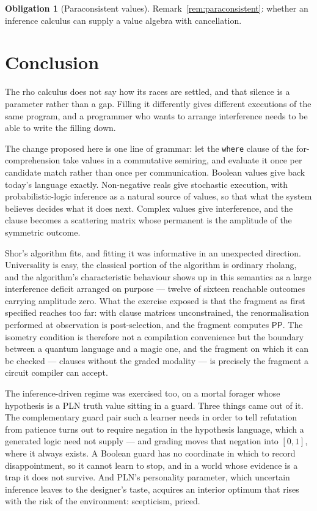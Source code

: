 \documentclass[11pt,a4paper]{article}
\theoremstyle{plain}
\theoremstyle{definition}
\newtheorem{obligation}[theorem]{Obligation}
\theoremstyle{remark}
\begin{document}
\begin{obligation}[Paraconsistent values]\label{ob:para}
Remark~\ref{rem:paraconsistent}: whether an inference calculus can supply a value
algebra with cancellation.
\end{obligation}

\section{Conclusion}\label{sec:conc}

The rho calculus does not say how its races are settled, and that silence is a
parameter rather than a gap. Filling it differently gives different executions of
the same program, and a programmer who wants to arrange interference needs to be
able to write the filling down.

The change proposed here is one line of grammar: let the \texttt{where} clause of
the for-comprehension take values in a commutative semiring, and evaluate it once
per candidate match rather than once per communication. Boolean values give back
today's language exactly. Non-negative reals give stochastic execution, with
probabilistic-logic inference as a natural source of values, so that what the
system believes decides what it does next. Complex values give interference, and
the clause becomes a scattering matrix whose permanent is the amplitude of the
symmetric outcome.

Shor's algorithm fits, and fitting it was informative in an unexpected
direction. Universality is easy, the classical portion of the algorithm is
ordinary rholang, and the algorithm's characteristic behaviour shows up in this
semantics as a large interference deficit arranged on purpose --- twelve of
sixteen reachable outcomes carrying amplitude zero. What the exercise exposed is
that the fragment as first specified reaches too far: with clause matrices
unconstrained, the renormalisation performed at observation is post-selection,
and the fragment computes $\mathsf{PP}$. The isometry condition is therefore not
a compilation convenience but the boundary between a quantum language and a
magic one, and the fragment on which it can be checked --- clauses without the
graded modality --- is precisely the fragment a circuit compiler can accept.

The inference-driven regime was exercised too, on a mortal forager whose
hypothesis is a PLN truth value sitting in a guard. Three things came out of it.
The complementary guard pair such a learner needs in order to tell refutation
from patience turns out to require negation in the hypothesis language, which a
generated logic need not supply --- and grading moves that negation into $[0,1]$,
where it always exists. A Boolean guard has no coordinate in which to record
disappointment, so it cannot learn to stop, and in a world whose evidence is a
trap it does not survive. And PLN's personality parameter, which uncertain
inference leaves to the designer's taste, acquires an interior optimum that rises
with the risk of the environment: scepticism, priced.
\end{document}
